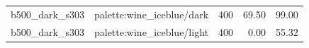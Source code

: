 \begin{longtable}{l>{\raggedright\arraybackslash}p{.42\linewidth}rrr}
b500\_\allowbreak{}dark\_\allowbreak{}s303 & %
palette:wine\_\allowbreak{}iceblue/dark & %
400 & %
69.50 & %
99.00 \\ %

b500\_\allowbreak{}dark\_\allowbreak{}s303 & %
palette:wine\_\allowbreak{}iceblue/light & %
400 & %
0.00 & %
55.32 \\ %


\end{longtable}
